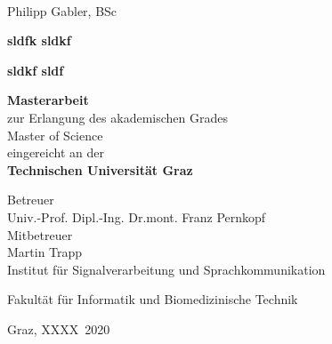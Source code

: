 
\begin{titlingpage}


%

\begin{center}
~
\vfill\vfill\vfill

\sffamily

Philipp Gabler, BSc

\vfill

{\LARGE\bfseries sldfk sldkf}

{\large\bfseries sldkf sldf}

\vfill\vfill\vfill\vfill

{\normalsize\bfseries Masterarbeit}\\
\vfill
zur Erlangung des akademischen Grades\\
{Master of Science}\\
\vfill
eingereicht an der\\
{\normalsize\bfseries Technischen Universität Graz}

\vfill\vfill\vfill
\vfill\vfill\vfill

Betreuer\\
Univ.-Prof. Dipl.-Ing. Dr.\thinspace{}mont. Franz Pernkopf\\
\vfill
Mitbetreuer\\
Martin Trapp\\
\vfill
\vfill
Institut für Signalverarbeitung und Sprachkommunikation\\

\vfill

Fakultät für Informatik und Biomedizinische Technik

\vfill\vfill\vfill

{\scriptsize Graz, XXXX~2020}

\end{center}
\end{titlingpage}

